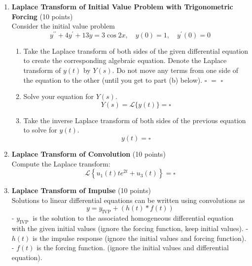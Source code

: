 \begin{enumerate}
  \item \textbf{Laplace Transform of Initial Value Problem with Trigonometric Forcing} (10 points)\\
  Consider the initial value problem
  $$
  y^{\prime \prime}+4 y^{\prime}+13 y=3 \cos 2 x, \quad y(0)=1, \quad y^{\prime}(0)=0
  $$
  \begin{enumerate}[label=\alph*]
    \item Take the Laplace transform of both sides of the given differential 
    equation to create the corresponding algebraic equation. Denote the 
    Laplace transform of $y(t)$ by $Y(s)$. Do not move any terms from 
    one side of the equation to the other (until you get to part (b) below).
    $\square$ $=$ $\square$
    \begin{subanswer}
    \end{subanswer}
    \item Solve your equation for $Y(s)$.
    $$
    Y(s)=\mathcal{L}\{y(t)\}=\square
    $$
    \begin{subanswer}
    \end{subanswer}
    \item Take the inverse Laplace transform of both sides of the previous equation to solve for $y(t)$.
    $$
    y(t)=\square
    $$
    \begin{subanswer}
    \end{subanswer}
  \end{enumerate}

  \item \textbf{Laplace Transform of Convolution} (10 points)\\
  Compute the Laplace transform:
  $$
  \mathcal{L}\left\{u_1(t) t e^{2 t}+u_3(t)\right\}=\square
  $$
  \begin{subanswer}
  \end{subanswer}

  \item \textbf{Laplace Transform of Impulse} (10 points)\\
  Solutions to linear differential equations can be written using convolutions as
  $$
  y=y_{\mathrm{IVP}}+(h(t) * f(t))
  $$
  - $y_{\text {IVP }}$ is the solution to the associated homogeneous differential equation with the given initial values
  (ignore the forcing function, keep initial values).
  - $h(t)$ is the impulse response
  (ignore the initial values and forcing function).
  - $f(t)$ is the forcing function.
  (ignore the initial values and differential equation).


\end{enumerate}
